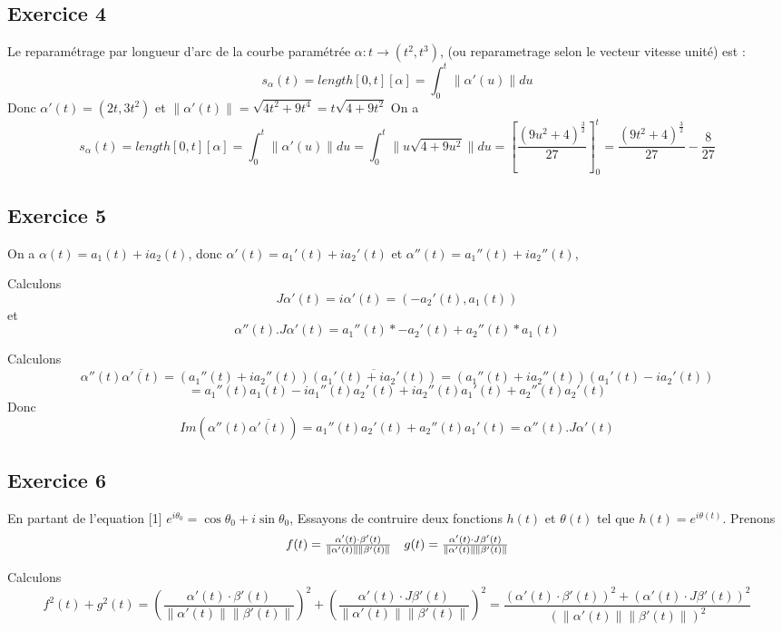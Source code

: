 \documentclass[]{book}
\theoremstyle{definition}
\begin{document}
\subsection*{Exercice 4}
Le reparam\'etrage par longueur d'arc de la courbe param\'etr\'ee $\alpha : t \to (t^2, t^3)$, (ou reparametrage selon le vecteur vitesse unit\'e) est :
$$
s_{\alpha}(t) = length[0,t][\alpha] = \int_0^t \lVert \alpha'(u) \rVert du
$$ 
Donc $\alpha'(t) = (2t, 3t^2)$ et $\lVert \alpha'(t) \rVert = \sqrt{4t^2+9t^4} = t\sqrt{4+9t^2}$
On a
$$
s_{\alpha}(t) = length[0,t][\alpha] = \int_0^t \lVert \alpha'(u) \rVert du = \int_0^t \lVert u\sqrt{4+9u^2} \rVert du = \left[ \frac{(9u^2+4)^{\frac{3}{2}}}{27}\right]_0^t = \frac{(9t^2+4)^{\frac{3}{2}}}{27} - \frac{8}{27}
$$


\subsection*{Exercice 5}
On a  $\alpha(t) = a_1(t) + ia_2(t)$, donc $\alpha'(t) = a_1'(t) + ia_2'(t)$ et $\alpha''(t) = a_1''(t) + ia_2''(t)$,

Calculons
$$
J\alpha'(t) = i\alpha'(t) = (-a_2'(t), a_1(t))
$$
et 
$$
\alpha''(t).J\alpha'(t) = a_1''(t) * -a_2'(t) + a_2''(t) * a_1(t)
$$

Calculons
$$
\alpha''(t)\overline{\alpha'(t)} = (a_1''(t)+ia_2''(t))\overline{(a_1'(t)+ia_2'(t))} = (a_1''(t)+ia_2''(t))(a_1'(t)-ia_2'(t)) 
$$
$$
= a_1''(t)a_1(t) -ia_1''(t)a_2'(t) +  ia_2''(t)a_1'(t) + a_2''(t)a_2'(t) 
$$
Donc
$$
Im(\alpha''(t)\overline{\alpha'(t)}) = a_1''(t)a_2'(t) + a_2''(t)a_1'(t) = \alpha''(t).J\alpha'(t)
$$


\subsection*{Exercice 6}
En partant de l'equation [1] $e^{i\theta_0} = \cos \theta_0 + i \sin \theta_0$, Essayons de contruire deux fonctions $h(t)$ et $\theta(t)$ tel que $h(t) = e^{i\theta(t)}$. 
Prenons
$$
\begin{array}{l l}
f(t) = \frac{\alpha'(t) \cdot \beta'(t)}{\lVert \alpha'(t) \rVert \lVert \beta'(t) \lVert} & g(t) = \frac{\alpha'(t) \cdot J\beta'(t)}{\lVert \alpha'(t) \rVert \lVert \beta'(t) \lVert}
\end{array}
$$

Calculons 
$$
f^2(t) + g^2(t) = \left( \frac{\alpha'(t) \cdot \beta'(t)}{\lVert \alpha'(t) \rVert \lVert \beta'(t) \lVert} \right)^2 + \left( \frac{\alpha'(t) \cdot J\beta'(t)}{\lVert \alpha'(t) \rVert \lVert \beta'(t) \lVert} \right)^2 = \frac{\left( \alpha'(t) \cdot \beta'(t)\right)^2 + \left( \alpha'(t) \cdot J\beta'(t)\right)^2 }{\left( \lVert \alpha'(t) \rVert \lVert \beta'(t) \lVert \right)^2}
$$ 
\end{document}
